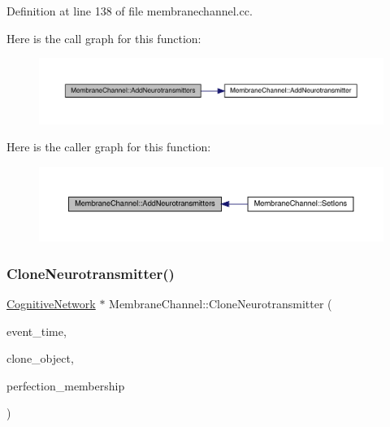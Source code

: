 Definition at line 138 of file membranechannel.\+cc.

Here is the call graph for this function\+:\nopagebreak
\begin{figure}[H]
\begin{center}
\leavevmode
\includegraphics[width=350pt]{class_membrane_channel_a01fb5f3176cfa3423bb10a04bf69da01_cgraph}
\end{center}
\end{figure}
Here is the caller graph for this function\+:\nopagebreak
\begin{figure}[H]
\begin{center}
\leavevmode
\includegraphics[width=350pt]{class_membrane_channel_a01fb5f3176cfa3423bb10a04bf69da01_icgraph}
\end{center}
\end{figure}
\mbox{\label{class_membrane_channel_af667720bd2214ea3a1e6d272b57d3a79}} 
\subsubsection{\texorpdfstring{Clone\+Neurotransmitter()}{CloneNeurotransmitter()}}
{\footnotesize\ttfamily \hyperlink{class_cognitive_network}{Cognitive\+Network} $\ast$ Membrane\+Channel\+::\+Clone\+Neurotransmitter (\begin{DoxyParamCaption}\item[{std\+::chrono\+::time\+\_\+point$<$ \hyperlink{universe_8h_a0ef8d951d1ca5ab3cfaf7ab4c7a6fd80}{Clock} $>$}]{event\+\_\+time,  }\item[{\hyperlink{class_cognitive_network}{Cognitive\+Network} $\ast$}]{clone\+\_\+object,  }\item[{double}]{perfection\+\_\+membership }\end{DoxyParamCaption})}



